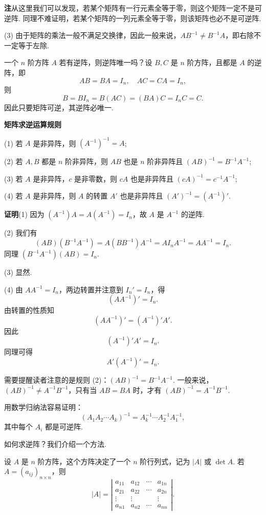 \documentclass[UTF8, 12pt, fontset=fandol, oneside]{ctexart}
\begin{document}
\noindent\textbf{注}\quad 从这里我们可以发现，若某个矩阵有一行元素全等于零，则这个矩阵一定不是可逆阵. 同理不难证明，若某个矩阵的一列元素全等于零，则该矩阵也必不是可逆阵.

(3) 由于矩阵的乘法一般不满足交换律，因此一般来说，$AB^{-1}\ne B^{-1}A$，即右除不一定等于左除.

一个 $n$ 阶方阵 $A$ 若有逆阵，则逆阵唯一吗？设 $B,C$ 是 $n$ 阶方阵，且都是 $A$ 的逆阵，即
\[
AB=BA=I_n,\quad AC=CA=I_n,
\]
则
\[
B=BI_n=B(AC)=(BA)C=I_nC=C.
\]
因此只要矩阵可逆，其逆阵必唯一.

\noindent\textbf{矩阵求逆运算规则}

(1) 若 $A$ 是非异阵，则 $(A^{-1})^{-1}=A$;

(2) 若 $A,B$ 都是 $n$ 阶非异阵，则 $AB$ 也是 $n$ 阶非异阵且 $(AB)^{-1}=B^{-1}A^{-1}$;

(3) 若 $A$ 是非异阵，$c$ 是非零数，则 $cA$ 也是非异阵且 $(cA)^{-1}=c^{-1}A^{-1}$;

(4) 若 $A$ 是非异阵，则 $A$ 的转置 $A'$ 也是非异阵且 $(A')^{-1}=(A^{-1})'$.

\noindent\textbf{证明}\quad (1) 因为 $(A^{-1})A=A(A^{-1})=I_n$，故 $A$ 是 $A^{-1}$ 的逆阵.

(2) 我们有
\[
(AB)(B^{-1}A^{-1})=A(BB^{-1})A^{-1}=AI_nA^{-1}=AA^{-1}=I_n.
\]
同理 $(B^{-1}A^{-1})(AB)=I_n$.

(3) 显然.

(4) 由 $AA^{-1}=I_n$，两边转置并注意到 $I_n'=I_n$，得
\[
(AA^{-1})'=I_n.
\]
由转置的性质知
\[
(AA^{-1})'=(A^{-1})'A'.
\]
因此
\[
(A^{-1})'A'=I_n.
\]
同理可得
\[
A'(A^{-1})'=I_n.
\]

需要提醒读者注意的是规则 (2)：$(AB)^{-1}=B^{-1}A^{-1}$. 一般来说，$(AB)^{-1}\ne A^{-1}B^{-1}$，只有当 $AB=BA$ 时，才有 $(AB)^{-1}=A^{-1}B^{-1}$.

用数学归纳法容易证明：
\[
(A_1A_2\cdots A_k)^{-1}=A_k^{-1}\cdots A_2^{-1}A_1^{-1},
\]
其中每个 $A_i$ 都是可逆阵.

如何求逆阵？我们介绍一个方法.

设 $A$ 是 $n$ 阶方阵，这个方阵决定了一个 $n$ 阶行列式，记为 $|A|$ 或 $\det A$. 若 $A=(a_{ij})_{n\times n}$，则
\[
|A|=\left|\begin{array}{cccc}
a_{11} & a_{12} & \cdots & a_{1n}\\
a_{21} & a_{22} & \cdots & a_{2n}\\
\vdots & \vdots & & \vdots\\
a_{n1} & a_{n2} & \cdots & a_{nn}
\end{array}\right|.
\]
\end{document}
